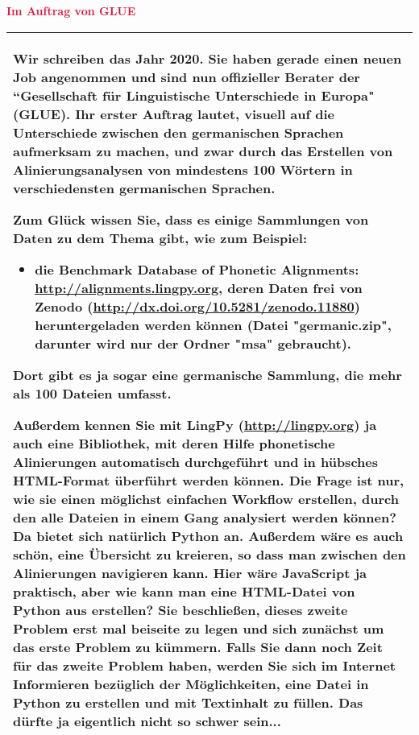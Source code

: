 \documentclass[xetex,svgnames]{scrartcl}
\newcommand{\Table}[1]{%
    \begin{flushleft}
        \begin{tabular}{|p{16.5cm}|}
            \hline \cellcolor{lightgray} \bf \pur #1
            \\\hline
        \end{tabular}
    \end{flushleft}
}
\begin{document}
\begin{center}
    {\textcolor{Crimson}{\bf \huge  Im Auftrag von GLUE} }
\end{center}

\Table{%
Wir schreiben das Jahr 2020. Sie haben gerade einen neuen Job angenommen und sind nun offizieller
Berater der ``Gesellschaft für Linguistische Unterschiede in Europa" (GLUE). Ihr erster Auftrag
lautet, visuell auf die Unterschiede zwischen den germanischen Sprachen aufmerksam zu machen, und
zwar durch das Erstellen von Alinierungsanalysen von mindestens 100 Wörtern in verschiedensten
germanischen Sprachen. 
 
Zum Glück wissen Sie, dass es einige Sammlungen von Daten zu dem Thema gibt, wie zum Beispiel:
\begin{itemize}
  \item die \textbf{Benchmark Database of Phonetic Alignments}: \url{http://alignments.lingpy.org},
    deren Daten frei von \textbf{Zenodo} (\url{http://dx.doi.org/10.5281/zenodo.11880})
    heruntergeladen werden können (Datei "germanic.zip", darunter wird nur der Ordner "msa"
    gebraucht). 
\end{itemize}

Dort gibt es ja sogar eine germanische Sammlung, die mehr als 100 Dateien umfasst. 

Außerdem kennen Sie mit \textbf{LingPy} (\url{http://lingpy.org}) ja auch eine Bibliothek, mit deren Hilfe phonetische Alinierungen automatisch
durchgeführt und in hübsches HTML-Format überführt werden können. Die Frage ist nur, wie sie einen
möglichst einfachen Workflow erstellen, durch den alle Dateien in einem Gang analysiert werden
können? Da bietet sich natürlich Python an. Außerdem wäre es auch schön, eine Übersicht zu kreieren,
so dass man zwischen den Alinierungen navigieren kann. Hier wäre JavaScript ja praktisch, aber wie
kann man eine HTML-Datei von Python aus erstellen? Sie beschließen, dieses zweite Problem erst mal
beiseite zu legen und sich zunächst um das erste Problem zu kümmern. Falls Sie dann noch Zeit für
das zweite Problem haben, werden Sie sich im Internet Informieren bezüglich der Möglichkeiten, eine
Datei in Python zu erstellen und mit Textinhalt zu füllen. Das dürfte ja eigentlich nicht so schwer
sein...
}
\end{document}
